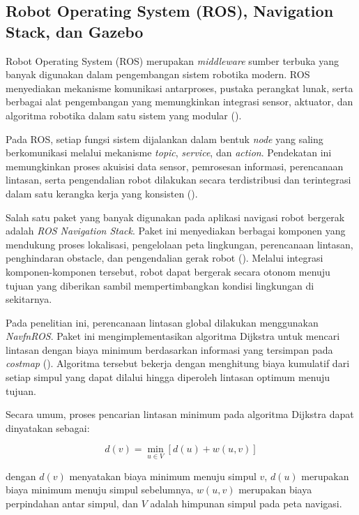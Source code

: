 \subsection{Robot Operating System (ROS), Navigation Stack, dan Gazebo}

Robot Operating System (ROS) merupakan \textit{middleware} sumber terbuka yang banyak digunakan dalam pengembangan sistem robotika modern. ROS menyediakan mekanisme komunikasi antarproses, pustaka perangkat lunak, serta berbagai alat pengembangan yang memungkinkan integrasi sensor, aktuator, dan algoritma robotika dalam satu sistem yang modular (\cite{Quigley2009,Macenski2022}).

Pada ROS, setiap fungsi sistem dijalankan dalam bentuk \textit{node} yang saling berkomunikasi melalui mekanisme \textit{topic}, \textit{service}, dan \textit{action}. Pendekatan ini memungkinkan proses akuisisi data sensor, pemrosesan informasi, perencanaan lintasan, serta pengendalian robot dilakukan secara terdistribusi dan terintegrasi dalam satu kerangka kerja yang konsisten (\cite{Quigley2009}).

Salah satu paket yang banyak digunakan pada aplikasi navigasi robot bergerak adalah \textit{ROS Navigation Stack}. Paket ini menyediakan berbagai komponen yang mendukung proses lokalisasi, pengelolaan peta lingkungan, perencanaan lintasan, penghindaran obstacle, dan pengendalian gerak robot (\cite{Macenski2022}). Melalui integrasi komponen-komponen tersebut, robot dapat bergerak secara otonom menuju tujuan yang diberikan sambil mempertimbangkan kondisi lingkungan di sekitarnya.

Pada penelitian ini, perencanaan lintasan global dilakukan menggunakan \textit{NavfnROS}. Paket ini mengimplementasikan algoritma Dijkstra untuk mencari lintasan dengan biaya minimum berdasarkan informasi yang tersimpan pada \textit{costmap} (\cite{Brock2009}). Algoritma tersebut bekerja dengan menghitung biaya kumulatif dari setiap simpul yang dapat dilalui hingga diperoleh lintasan optimum menuju tujuan.

Secara umum, proses pencarian lintasan minimum pada algoritma Dijkstra dapat dinyatakan sebagai:

\begin{equation}
d(v)=\min_{u \in V}
\left[
d(u)+w(u,v)
\right]
\label{eq:dijkstra}
\end{equation}

dengan $d(v)$ menyatakan biaya minimum menuju simpul $v$, $d(u)$ merupakan biaya minimum menuju simpul sebelumnya, $w(u,v)$ merupakan biaya perpindahan antar simpul, dan $V$ adalah himpunan simpul pada peta navigasi.

